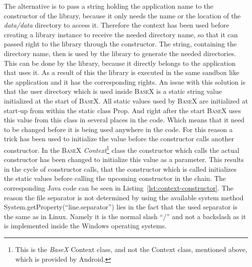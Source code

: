 The alternative is to pass a string holding the application name to the constructor of the library, because it only needs the name or the location of the \textit{data/data} directory to access it.
Therefore the context has been used before creating a library instance to receive the needed directory name, so that it can passed right to the library through the constructor.
The string, containing the directory name, then is used by the library to generate the needed directories.
This can be done by the library, because it directly belongs to the application that uses it.
As a result of this the library is executed in the same sandbox like the application and it has the corresponding rights.
An issue with this solution is that the user directory which is used inside \textsc{BaseX} is a static string value initialized at the start of \textsc{BaseX}.
All static values used by \textsc{BaseX} are initialized at start-up from within the static class \textsf{Prop}.
And right after the start \textsc{BaseX} uses this value from this class in several places in the code.
Which means that it need to be changed before it is being used anywhere in the code.
For this reason a trick has been used to initialize the value before the constructor calls another constructor.
In the \textsc{BaseX} \textit{Context}\footnote{This is the \textit{BaseX} Context class, and not the Context class, mentioned above, which is provided by Android.} class the constructor which calls the actual constructor has been changed to initialize this value as a parameter.
This results in the cycle of constructor calls, that the constructor which is called initializes the static values before calling the upcoming constructor in the chain.
The corresponding Java code can be seen in Listing~\ref{lst:context-constructor}.
The reason the file separator is not determined by using the available system method \textsf{System.getProperty(``line.separator'')} lies in the fact that the used separator is the same as in Linux.
Namely it is the normal slash ``/'' and not a backslash as it is implemented inside the Windows operating systems.



